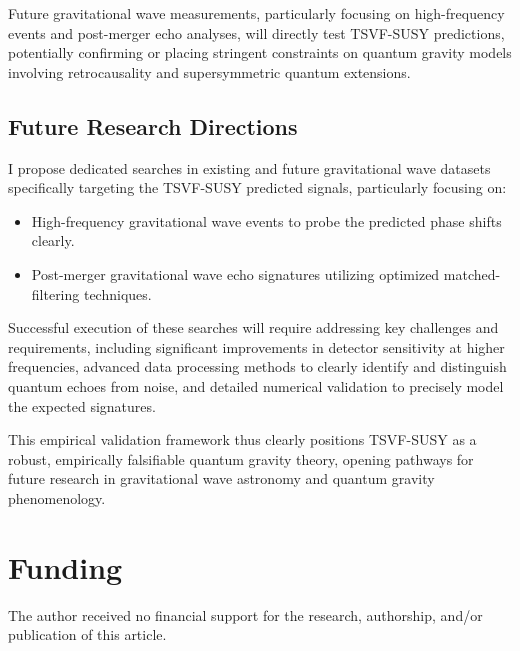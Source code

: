 \documentclass[twocolumn,superscriptaddress,floatfix]{revtex4-2}
\begin{document}
Future gravitational wave measurements, particularly focusing on high-frequency events and post-merger echo analyses, will directly test TSVF-SUSY predictions, potentially confirming or placing stringent constraints on quantum gravity models involving retrocausality and supersymmetric quantum extensions.

\subsection{Future Research Directions}\label{subsec:future_research_directions}
I propose dedicated searches in existing and future gravitational wave datasets specifically targeting the TSVF-SUSY predicted signals, particularly focusing on:
\begin{itemize}
    \item High-frequency gravitational wave events to probe the predicted phase shifts clearly.
    \item Post-merger gravitational wave echo signatures utilizing optimized matched-filtering techniques.
\end{itemize}

Successful execution of these searches will require addressing key challenges and requirements, including significant improvements in detector sensitivity at higher frequencies, advanced data processing methods to clearly identify and distinguish quantum echoes from noise, and detailed numerical validation to precisely model the expected signatures.

This empirical validation framework thus clearly positions TSVF-SUSY as a robust, empirically falsifiable quantum gravity theory, opening pathways for future research in gravitational wave astronomy and quantum gravity phenomenology.

\section{Funding}
The author received no financial support for the research, authorship, and/or publication of this article.


\end{document}
